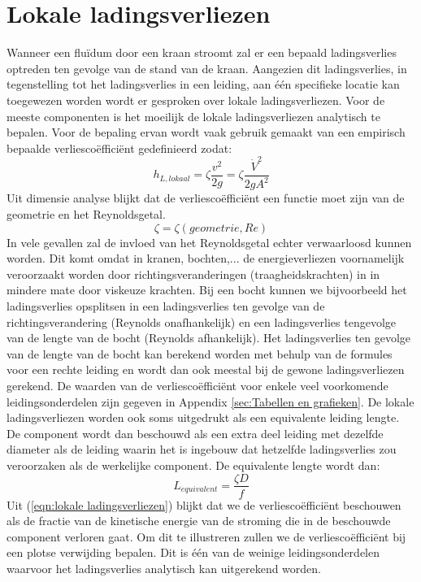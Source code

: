 	\section{Lokale ladingsverliezen}
	\label{sec:Lokale ladingsverliezen}
Wanneer een flu\"idum door een kraan stroomt zal er een bepaald ladingsverlies optreden ten gevolge van de stand van de kraan. Aangezien dit ladingsverlies, in tegenstelling tot het ladingsverlies in een leiding, aan \'e\'en specifieke locatie kan toegewezen worden wordt er gesproken over lokale ladingsverliezen. Voor de meeste componenten is het moeilijk de lokale ladingsverliezen analytisch te bepalen. Voor de bepaling ervan wordt vaak gebruik gemaakt van een empirisch bepaalde verliesco\"effici\"ent gedefinieerd zodat:
\begin{equation}
	h_{L, lokaal} = \zeta \frac{v^2}{2 g} = \zeta \frac{\dot{V}^2}{2 g A^2}
	\label{eqn:lokale ladingsverliezen}
\end{equation}
Uit dimensie analyse blijkt dat de verliesco\"effici\"ent een functie moet zijn van de geometrie en het Reynoldsgetal.
\begin{equation}
	\zeta = \zeta(geometrie, Re)
\end{equation}
In vele gevallen zal de invloed van het Reynoldsgetal echter verwaarloosd kunnen worden. Dit komt omdat in kranen, bochten,... de energieverliezen voornamelijk veroorzaakt worden door richtingsveranderingen (traagheidskrachten) in in mindere mate door viskeuze krachten. Bij een bocht kunnen we bijvoorbeeld het ladingsverlies opsplitsen in een ladingsverlies ten gevolge van de richtingsverandering (Reynolds onafhankelijk) en een ladingsverlies tengevolge van de lengte van de bocht (Reynolds afhankelijk). Het ladingsverlies ten gevolge van de lengte van de bocht kan berekend worden met behulp van de formules voor een rechte leiding en wordt dan ook meestal bij de gewone ladingsverliezen gerekend.
\npar
De waarden van de verliesco\"effici\"ent voor enkele veel voorkomende leidingsonderdelen zijn gegeven in Appendix \ref{sec:Tabellen en grafieken}.
\npar
De lokale ladingsverliezen worden ook soms uitgedrukt als een equivalente leiding lengte. De component wordt dan beschouwd als een extra deel leiding met dezelfde diameter als de leiding waarin het is ingebouw dat hetzelfde ladingsverlies zou veroorzaken als de werkelijke component. De equivalente lengte wordt dan:
\begin{equation}
	L_{equivalent} = \frac{\zeta D}{f}
\end{equation}
\npar
Uit (\ref{eqn:lokale ladingsverliezen}) blijkt dat we de verliesco\"effici\"ent beschouwen als de fractie van de kinetische energie van de stroming die in de beschouwde component verloren gaat. Om dit te illustreren zullen we de verliesco\"effici\"ent bij een plotse verwijding bepalen. Dit is \'e\'en van de weinige leidingsonderdelen waarvoor het ladingsverlies analytisch kan uitgerekend worden.

